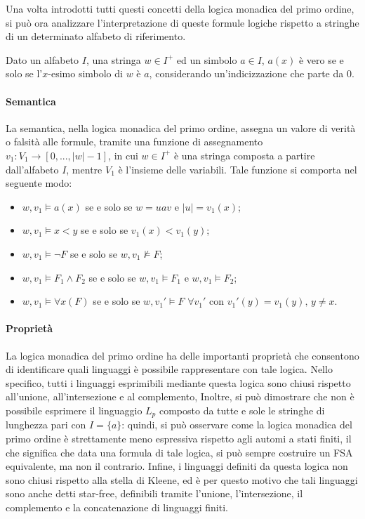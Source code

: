 Una volta introdotti tutti questi concetti della logica monadica del primo ordine, si può ora analizzare l'interpretazione di queste formule logiche rispetto a stringhe di un determinato alfabeto di riferimento.

Dato un alfabeto \(I\), una stringa \(w\in I^+\) ed un simbolo \(a\in I\), \(a(x)\) è vero se e solo se l'\(x\)-esimo simbolo di \(w\) è \(a\), considerando un'indicizzazione che parte da 0.

\paragraph*{Semantica} La semantica, nella logica monadica del primo ordine, assegna un valore di verità o falsità alle formule, tramite una funzione di assegnamento \(v_1 : V_1\to [0,...,|w|-1]\), in cui \(w\in I^+\) è una stringa composta a partire dall'alfabeto \(I\), mentre \(V_1\) è l'insieme delle variabili. Tale funzione si comporta nel seguente modo:
\begin{itemize}
  \item \(w, v_1 \vDash a(x)\) se e solo se \(w = uav\) e \(|u| = v_1(x)\);
  \item \(w, v_1 \vDash x<y\) se e solo se \(v_1(x) < v_1(y)\);
  \item \(w, v_1 \vDash \lnot F\) se e solo se \(w, v_1 \nvDash F\);
  \item \(w, v_1 \vDash F_1 \wedge F_2\) se e solo se \(w,v_1 \vDash F_1\) e \(w,v_1\vDash F_2\);
  \item \(w, v_1 \vDash \forall x(F)\) se e solo se \(w, v_1' \vDash F\,\, \forall v_1'\) con \(v_1'(y) = v_1(y),\, y\neq x\).
\end{itemize}

\paragraph*{Proprietà} La logica monadica del primo ordine ha delle importanti proprietà che consentono di identificare quali linguaggi è possibile rappresentare con tale logica. Nello specifico, tutti i linguaggi esprimibili mediante questa logica sono chiusi rispetto all'unione, all'intersezione e al complemento, Inoltre, si può dimostrare che non è possibile esprimere il linguaggio \(L_p\) composto da tutte e sole le stringhe di lunghezza pari con \(I = \{a\}\): quindi, si può osservare come la logica monadica del primo ordine è strettamente meno espressiva rispetto agli automi a stati finiti, il che significa che data una formula di tale logica, si può sempre costruire un FSA equivalente, ma non il contrario. Infine, i linguaggi definiti da questa logica non sono chiusi rispetto alla stella di Kleene, ed è per questo motivo che tali linguaggi sono anche detti star-free, definibili tramite l'unione, l'intersezione, il complemento e la concatenazione di linguaggi finiti. 

